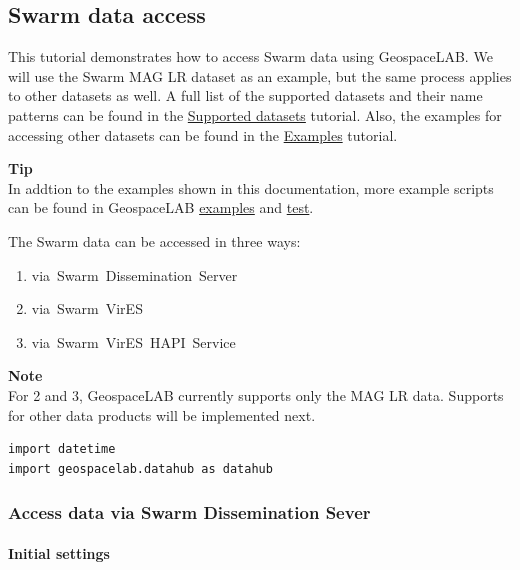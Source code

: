 \subsection{Swarm data access}

This tutorial demonstrates how to access Swarm data using GeospaceLAB. We will use the Swarm MAG LR dataset as an example, but the same process applies to other datasets as well.
A full list of the supported datasets and their name patterns can be found in the \href{/supported-datasets}{Supported datasets} tutorial. Also, the examples for accessing other datasets can be found in the \href{/example-swarm-mag}{Examples} tutorial.

\begin{framed}
\textbf{Tip}\\
In addtion to the examples shown in this documentation, more example scripts can be found in GeospaceLAB \href{https://github.com/JouleCai/geospacelab/tree/master/examples}{examples} and \href{https://github.com/JouleCai/geospacelab/tree/master/test}{test}.
\end{framed}

The Swarm data can be accessed in three ways:

\begin{enumerate}
\item via~Swarm~Dissemination~Server
\item via~Swarm~VirES
\item via~Swarm~VirES~HAPI~Service
\end{enumerate}

\begin{framed}
\textbf{Note}\\
For 2 and 3, GeospaceLAB currently supports only the MAG LR data. Supports for other data products will be implemented next.
\end{framed}

\begin{verbatim}
import datetime
import geospacelab.datahub as datahub
\end{verbatim}

\subsubsection{Access data via Swarm Dissemination Sever}\label{swarm-dissemination-server}

\paragraph{Initial settings}

